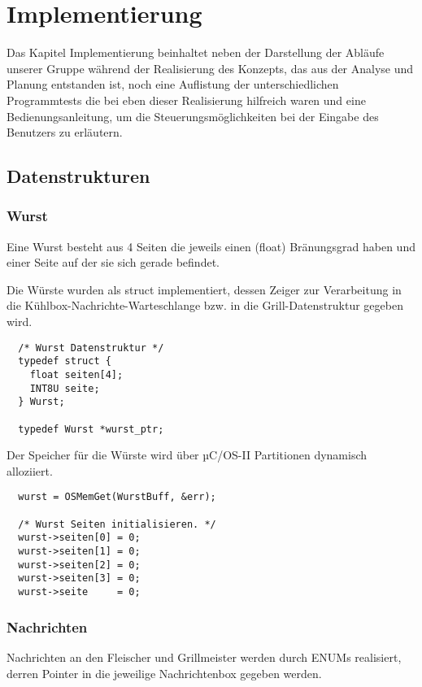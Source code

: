 \chapter{Implementierung}

Das Kapitel Implementierung beinhaltet neben der Darstellung der Abläufe unserer Gruppe während der Realisierung des Konzepts, das aus der Analyse und Planung entstanden ist, noch eine Auflistung der unterschiedlichen Programmtests die bei eben dieser Realisierung hilfreich waren und eine Bedienungsanleitung, um die Steuerungsmöglichkeiten bei der Eingabe des Benutzers zu erläutern.

\section{Datenstrukturen}

\subsection{Wurst}

Eine Wurst besteht aus 4 Seiten die jeweils einen (float) Bränungsgrad haben und einer Seite auf der sie sich gerade befindet.

Die Würste wurden als struct implementiert, dessen Zeiger zur Verarbeitung in die Kühlbox-Nachrichte-Warteschlange bzw. in die Grill-Datenstruktur gegeben wird.

\begin{lstlisting}
  /* Wurst Datenstruktur */
  typedef struct {
    float seiten[4];
    INT8U seite;
  } Wurst;

  typedef Wurst *wurst_ptr;
\end{lstlisting}

Der Speicher für die Würste wird über µC/OS-II Partitionen dynamisch alloziiert.

\begin{lstlisting}
  wurst = OSMemGet(WurstBuff, &err);

  /* Wurst Seiten initialisieren. */
  wurst->seiten[0] = 0;
  wurst->seiten[1] = 0;
  wurst->seiten[2] = 0;
  wurst->seiten[3] = 0;
  wurst->seite     = 0;
\end{lstlisting}

\subsection{Nachrichten}

Nachrichten an den Fleischer und Grillmeister werden durch ENUMs realisiert, derren Pointer in die jeweilige Nachrichtenbox gegeben werden.

